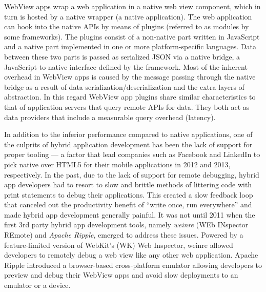 \documentclass[thesis.tex]{subfiles}
\begin{document}
WebView apps wrap a web application in a native web view component, which in turn is hosted by a native wrapper (a native application). The web application can hook into the native APIs by means of plugins (referred to as modules by some frameworks). The plugins consist of a non-native part written in JavaScript and a native part implemented in one or more platform-specific languages. Data between these two parts is passed as serialized JSON via a native bridge, a JavaScript-to-native interface defined by the framework. Most of the inherent overhead in WebView apps is caused by the message passing through the native bridge as a result of data serialization/deserialization and the extra layers of abstraction. In this regard WebView app plugins share similar characteristics to that of application servers that query remote APIs for data. They both act as data providers that include a measurable query overhead (latency).

In addition to the inferior performance compared to native applications, one of the culprits of hybrid application development has been the lack of support for proper tooling --- a factor that lead companies such as Facebook and LinkedIn to pick native over HTML5 for their mobile applications \cite{html_vs_native_facebook}\cite{html_vs_native_linkedin} in 2012 and 2013, respectively. In the past, due to the lack of support for remote debugging, hybrid app developers had to resort to slow and brittle methods of littering code with print statements to debug their applications. This created a slow feedback loop that canceled out the productivity benefit of ``write once, run everywhere'' and made hybrid app development generally painful. It was not until 2011 when the first 3rd party hybrid app development tools, namely \textit{weinre} (WEb INspector REmote) and \textit{Apache Ripple}, emerged to address these issues. Powered by a feature-limited version of WebKit's (WK) Web Inspector, weinre allowed developers to remotely debug a web view like any other web application. Apache Ripple introduced a browser-based cross-platform emulator allowing developers to preview and debug their WebView apps and avoid slow deployments to an emulator or a device.
\end{document}
